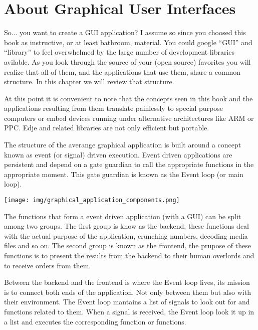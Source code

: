 \documentclass[12pt,a4paper,english]{book}
\begin{document}

\hypertarget{about-graphical-user-interfaces}{}
\chapter{About Graphical User Interfaces}
\label{about-graphical-user-interfaces}

So... you want to create a GUI application? I assume so since you choosed this
book as instructive, or at least bathroom, material. You could google ``GUI'' and
``library'' to feel overwhelmed by the large number of development libraries
avilable. As you look through the source of your (open source) favorites you
will realize that all of them, and the applications that use them, share a
common structure. In this chapter we will review that structure.

At this point it is convenient to note that the concepts seen in this book and
the applications resulting from them translate painlessly to special purpose
computers or embed devices running under alternative architectures like ARM or
PPC. Edje and related libraries are not only efficient but portable.

The structure of the averange graphical application is built around a concept
known as event (or signal) driven execution. Event driven applications are
persistent and depend on a gate guardian to call the appropriate functions in
the appropriate moment. This gate guardian is known as the Event loop (or main
loop).

{\hfill\texttt{[image: img/graphical\_application\_components.png]}\hfill}

The functions that form a event driven application (with a GUI) can be split
among two groups. The first group is know as the backend, these functions deal
with the actual purpose of the application, crunching numbers, decoding media
files and so on. The second group is known as the frontend, the prupose of
these functions is to present the results from the backend to their human
overlords and to receive orders from them.

Between the backend and the frontend is where the Event loop lives, its mission
is to connect both ends of the application. Not only between them but also with
their environment. The Event loop mantains a list of signals to look out for
and functions related to them. When a signal is received, the Event loop look
it up in a list and executes the corresponding function or functions.
\end{document}
